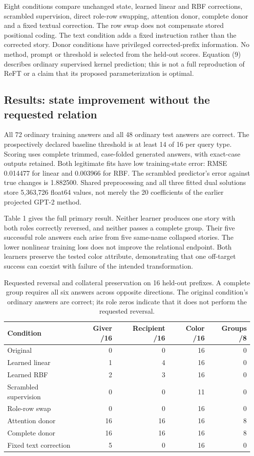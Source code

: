 \documentclass[11pt,letterpaper]{article}
\begin{document}
Eight conditions compare unchanged state, learned linear and RBF corrections, scrambled supervision, direct role-row swapping, attention donor, complete donor and a fixed textual correction. The row swap does not compensate stored positional coding. The text condition adds a fixed instruction rather than the corrected story. Donor conditions have privileged corrected-prefix information. No method, prompt or threshold is selected from the held-out scores. Equation (9) describes ordinary supervised kernel prediction; this is not a full reproduction of ReFT or a claim that its proposed parameterization is optimal.

\subsection{Results: state improvement without the requested relation}

All 72 ordinary training answers and all 48 ordinary test answers are correct. The prospectively declared baseline threshold is at least 14 of 16 per query type. Scoring uses complete trimmed, case-folded generated answers, with exact-case outputs retained. Both legitimate fits have low training-state error: RMSE 0.014477 for linear and 0.003966 for RBF. The scrambled predictor's error against true changes is 1.882500. Shared preprocessing and all three fitted dual solutions store 5,363,726 float64 values, not merely the 20 coefficients of the earlier projected GPT-2 method.

Table 1 gives the full primary result. Neither learner produces one story with both roles correctly reversed, and neither passes a complete group. Their five successful role answers each arise from five same-name collapsed stories. The lower nonlinear training loss does not improve the relational endpoint. Both learners preserve the tested color attribute, demonstrating that one off-target success can coexist with failure of the intended transformation.

\begin{table}[htbp]
\centering
\caption{Requested reversal and collateral preservation on 16 held-out prefixes. A complete group requires all six answers across opposite directions. The original condition's ordinary answers are correct; its role zeros indicate that it does not perform the requested reversal.}
\begin{tabularx}{\textwidth}{@{}Xrrrr@{}}
\toprule
Condition & Giver /16 & Recipient /16 & Color /16 & Groups /8 \\
\midrule
Original & 0 & 0 & 16 & 0 \\
Learned linear & 1 & 4 & 16 & 0 \\
Learned RBF & 2 & 3 & 16 & 0 \\
Scrambled supervision & 0 & 0 & 11 & 0 \\
Role-row swap & 0 & 0 & 16 & 0 \\
Attention donor & 16 & 16 & 16 & 8 \\
Complete donor & 16 & 16 & 16 & 8 \\
Fixed text correction & 5 & 0 & 16 & 0 \\
\bottomrule
\end{tabularx}
\end{table}
\end{document}
